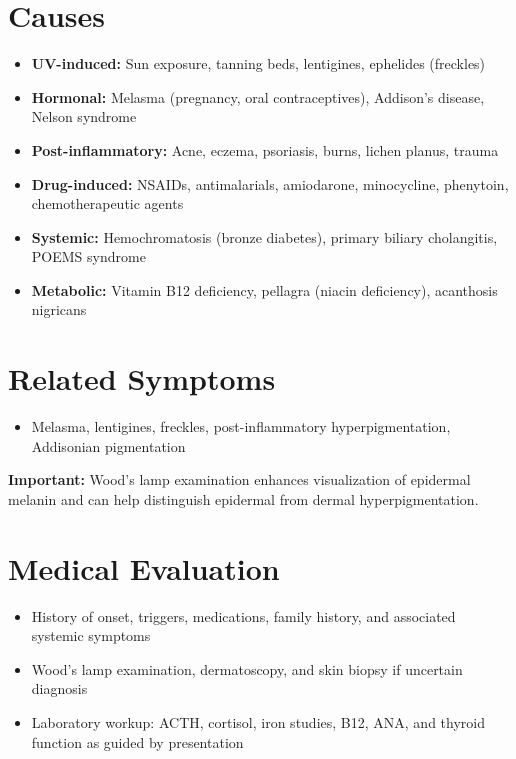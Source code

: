 \section*{Causes}
\begin{itemize}
  \item \textbf{UV-induced:} Sun exposure, tanning beds, lentigines, ephelides (freckles)
  \item \textbf{Hormonal:} Melasma (pregnancy, oral contraceptives), Addison's disease, Nelson syndrome
  \item \textbf{Post-inflammatory:} Acne, eczema, psoriasis, burns, lichen planus, trauma
  \item \textbf{Drug-induced:} NSAIDs, antimalarials, amiodarone, minocycline, phenytoin, chemotherapeutic agents
  \item \textbf{Systemic:} Hemochromatosis (bronze diabetes), primary biliary cholangitis, POEMS syndrome
  \item \textbf{Metabolic:} Vitamin B12 deficiency, pellagra (niacin deficiency), acanthosis nigricans
\end{itemize}

\section*{Related Symptoms}
\begin{itemize}
  \item Melasma, lentigines, freckles, post-inflammatory hyperpigmentation, Addisonian pigmentation
\end{itemize}
\textbf{Important:} Wood's lamp examination enhances visualization of epidermal melanin and can help distinguish epidermal from dermal hyperpigmentation.

\section*{Medical Evaluation}
\begin{itemize}
  \item History of onset, triggers, medications, family history, and associated systemic symptoms
  \item Wood's lamp examination, dermatoscopy, and skin biopsy if uncertain diagnosis
  \item Laboratory workup: ACTH, cortisol, iron studies, B12, ANA, and thyroid function as guided by presentation
\end{itemize}

